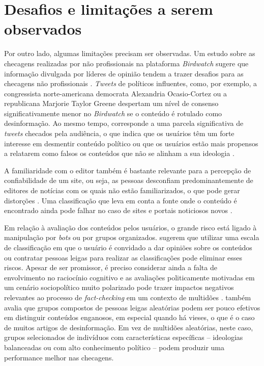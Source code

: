 \documentclass[portuguese]{textolivre}
\begin{document}
\section{Desafios e limitações a serem observados}
Por outro lado, algumas limitações precisam ser observadas. Um estudo sobre as checagens realizadas por não profissionais na plataforma \emph{Birdwatch} sugere que informação divulgada por líderes de opinião tendem a trazer desafios para as checagens não profissionais \cite[p. 803]{prollochs_community-based_nodate}. \emph{Tweets} de políticos influentes, como, por exemplo, a congressista norte-americana democrata Alexandria Ocasio-Cortez ou a republicana Marjorie Taylor Greene despertam um nível de consenso significativamente menor no \emph{Birdwatch} se o conteúdo é rotulado como desinformação. Ao mesmo tempo, corresponde a uma parcela significativa de \emph{tweets} checados pela audiência, o que indica que os usuários têm um forte interesse em desmentir conteúdo político ou que os usuários estão mais propensos a relatarem como falsos os conteúdos que não se alinham a sua ideologia \cite{prollochs_community-based_nodate}.

A familiaridade com o editor também é bastante relevante para a percepção de confiabilidade de um site, ou seja, as pessoas desconfiam predominantemente de editores de notícias com os quais não estão familiarizados, o que pode gerar distorções \cite{allen_scaling_2021}. Uma classificação que leva em conta a fonte onde o conteúdo é encontrado ainda pode falhar no caso de sites e portais noticiosos novos \cite{godel_moderating_2021}.

Em relação à avaliação dos conteúdos pelos usuários, o grande risco está ligado à manipulação por \emph{bots} ou por grupos organizados. \textcite{allen_scaling_2021} sugerem que utilizar uma escala de classificação em que o usuário é convidado a dar opiniões sobre os conteúdos ou contratar pessoas leigas para realizar as classificações pode eliminar esses riscos. Apesar de ser promissor, é preciso considerar ainda a falta de envolvimento no raciocínio cognitivo e as avaliações politicamente motivadas em um cenário sociopolítico muito polarizado pode trazer impactos negativos relevantes ao processo de \emph{fact-checking} em um contexto de multidões \cite{prollochs_community-based_nodate}. \textcite{godel_moderating_2021} também avalia que grupos compostos de pessoas leigas aleatórias podem ser pouco efetivos em distinguir conteúdos enganosos, em especial quando há vieses, o que é o caso de muitos artigos de desinformação. Em vez de multidões aleatórias, neste caso, grupos selecionados de indivíduos com características específicas – ideologias balanceadas ou com alto conhecimento político – podem produzir uma performance melhor nas checagens.
\end{document}

